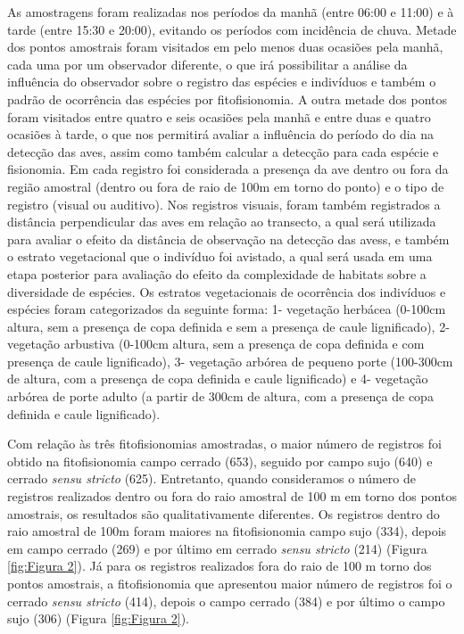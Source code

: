As amostragens foram realizadas nos períodos da manhã (entre 06:00 e 11:00) e à tarde (entre 15:30 e 20:00), evitando os períodos com incidência de chuva. Metade dos pontos amostrais foram visitados em pelo menos duas ocasiões pela manhã, cada uma por um observador diferente, o que irá possibilitar a análise da influência do observador sobre o registro das espécies e indivíduos e também o padrão de ocorrência das espécies por fitofisionomia. A outra metade dos pontos foram visitados entre quatro e seis ocasiões pela manhã e entre duas e quatro ocasiões à tarde, o que nos permitirá avaliar a influência do período do dia na detecção das aves, assim como também calcular a detecção para cada espécie e fisionomia. Em cada registro foi considerada a presença da ave dentro ou fora da região amostral (dentro ou fora de raio de 100m em torno do ponto) e o tipo de registro (visual ou auditivo). Nos registros visuais, foram também registrados a distância perpendicular das aves em relação ao transecto, a qual será utilizada para avaliar o efeito da distância de observação na detecção das avess, e também o estrato vegetacional que o indivíduo foi avistado, a qual será usada em uma etapa posterior para avaliação do efeito da complexidade de habitats sobre a diversidade de espécies. Os estratos vegetacionais de ocorrência dos indivíduos e espécies foram categorizados da seguinte forma: 1- vegetação herbácea (0-100cm altura, sem a presença de copa definida e sem a presença de caule lignificado), 2- vegetação arbustiva (0-100cm altura, sem a presença de copa definida e com presença de caule lignificado), 3- vegetação arbórea de pequeno porte (100-300cm de altura, com a presença de copa definida e caule lignificado) e 4- vegetação arbórea de porte adulto (a partir de 300cm de altura, com a presença de copa definida e caule lignificado).

Com relação às três fitofisionomias amostradas, o maior número de registros foi obtido na fitofisionomia campo cerrado (653), seguido por campo sujo (640) e cerrado \textit{sensu stricto} (625). Entretanto, quando consideramos o número de registros realizados dentro ou fora do raio amostral de 100 m em torno dos pontos amostrais, os resultados são qualitativamente diferentes.
Os registros dentro do raio amostral de 100m foram maiores na fitofisionomia campo sujo (334), depois em campo cerrado (269) e por último em cerrado \textit{sensu stricto} (214) (Figura \ref{fig:Figura 2}). Já para os registros realizados fora do raio de 100 m torno dos pontos amostrais, a fitofisionomia que apresentou maior número de registros foi o cerrado \textit{sensu stricto} (414), depois o campo cerrado (384) e por último o campo sujo (306) (Figura \ref{fig:Figura 2}).
